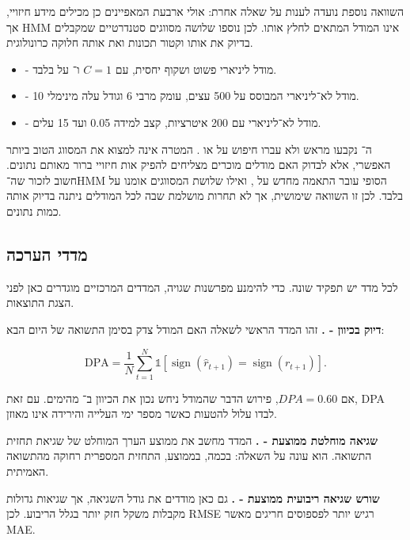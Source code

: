 השוואה נוספת נועדה לענות על שאלה אחרת: אולי ארבעת המאפיינים כן מכילים מידע חיזויי, אך HMM אינו המודל המתאים לחלץ אותו. לכן נוספו שלושה מסווגים סטנדרטיים שמקבלים בדיוק את אותו וקטור תכונות ואת אותה חלוקה כרונולוגית.

\begin{itemize}
    \item {} - מודל ליניארי פשוט ושקוף יחסית, עם \(C=1\) ו־ על  בלבד.
    \item {} - מודל לא־ליניארי המבוסס על 500 עצים, עומק מרבי 6 וגודל עלה מינימלי 10.
    \item {} - מודל  לא־ליניארי עם 200 איטרציות, קצב למידה 0.05 ועד 15 עלים.
\end{itemize}

ה־ נקבעו מראש ולא עברו חיפוש על  או . המטרה אינה למצוא את המסווג הטוב ביותר האפשרי, אלא לבדוק האם מודלים מוכרים מצליחים להפיק אות חיזויי ברור מאותם נתונים. חשוב לזכור שה־HMM הסופי עובר התאמה מחדש על , ואילו שלושת המסווגים אומנו על  בלבד. לכן זו השוואה שימושית, אך לא תחרות מושלמת שבה לכל המודלים ניתנה בדיוק אותה כמות נתונים.

\subsection{מדדי הערכה}

לכל מדד יש תפקיד שונה. כדי להימנע מפרשנות שגויה, המדדים המרכזיים מוגדרים כאן לפני הצגת התוצאות.

\textbf{דיוק בכיוון - .} זהו המדד הראשי לשאלה האם המודל צדק בסימן התשואה של היום הבא:

\begin{equation}
\mathrm{DPA}=\frac{1}{N}\sum_{t=1}^{N}\mathbb{1}\left[\operatorname{sign}(\hat r_{t+1})=\operatorname{sign}(r_{t+1})\right].
\end{equation}

אם \(DPA=0.60\), פירוש הדבר שהמודל ניחש נכון את הכיוון ב־ מהימים. עם זאת, DPA לבדו עלול להטעות כאשר מספר ימי העלייה והירידה אינו מאוזן.

\textbf{שגיאה מוחלטת ממוצעת - .} המדד מחשב את ממוצע הערך המוחלט של שגיאת תחזית התשואה. הוא עונה על השאלה: בכמה, בממוצע, התחזית המספרית רחוקה מהתשואה האמיתית.

\textbf{שורש שגיאה ריבועית ממוצעת - .} גם כאן מודדים את גודל השגיאה, אך שגיאות גדולות מקבלות משקל חזק יותר בגלל הריבוע. לכן RMSE רגיש יותר לפספוסים חריגים מאשר MAE.

